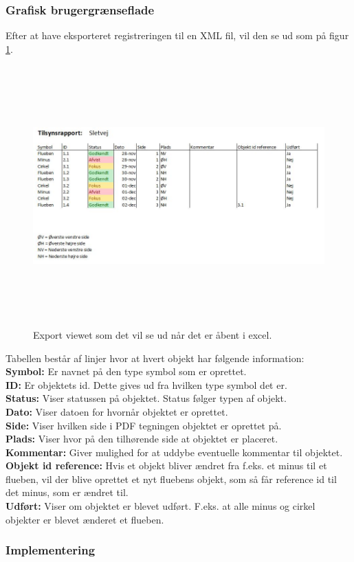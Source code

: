 \subsubsection{Grafisk brugergrænseflade}
Efter at have eksporteret registreringen til en XML fil, vil den se ud som på figur \ref{fig:Excel}.
\begin{figure}[H] %
	\centering
	\includegraphics[height=10cm, width=17cm]{../ArkitekturDesign/Design/Eksportering/Excel}
	\caption{Export viewet som det vil se ud når det er åbent i excel.}
	\label{fig:Excel}
\end{figure}
Tabellen består af linjer hvor at hvert objekt har følgende information: \\
\textbf{Symbol:} Er navnet på den type symbol som er oprettet. \\
\textbf{ID:} Er objektets id. Dette gives ud fra hvilken type symbol det er. \\
\textbf{Status:} Viser statussen på objektet. Status følger typen af objekt. \\
\textbf{Dato:} Viser datoen for hvornår objektet er oprettet. \\
\textbf{Side:} Viser hvilken side i PDF tegningen objektet er oprettet på. \\
\textbf{Plads:} Viser hvor på den tilhørende side at objektet er placeret. \\
\textbf{Kommentar:} Giver mulighed for at uddybe eventuelle kommentar til objektet. \\
\textbf{Objekt id reference:} Hvis et objekt bliver ændret fra f.eks. et minus til et flueben, vil der blive oprettet et nyt fluebens objekt, som så får reference id til det minus, som er ændret til. \\
\textbf{Udført:} Viser om objektet er blevet udført. F.eks. at alle minus og cirkel objekter er blevet ænderet et flueben. \\

\subsubsection{Implementering}

\clearpage